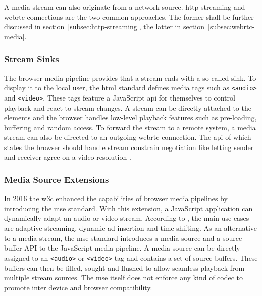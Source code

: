 A media stream can also originate from a network source. \Gls{http} streaming and \gls{webrtc} connections are the two common approaches. The former shall be further discussed in section~\ref{subsec:http-streaming}, the latter in section~\ref{subsec:webrtc-media}.

\subsubsection{Stream Sinks}

The browser media pipeline provides that a stream ends with a so called sink. To display it to the local user, the \gls{html} standard \cite[\S4.7]{html-w3c} defines media tags such as \lstinline|<audio>| and \lstinline|<video>|. These tags feature a JavaScript \gls{api} for themselves to control playback and react to stream changes. A stream can be directly attached to the elements and the browser handles low-level playback features such as pre-loading, buffering and random access. To forward the stream to a remote system, a media stream can also be directed to an outgoing \gls{webrtc} connection. The \gls{api} of which states the browser should handle stream constrain negotiation like letting sender and receiver agree on a video resolution \cite[\S5.1]{webrtc-w3c}.

\subsubsection{Media Source Extensions}

In 2016 the \gls{w3c} enhanced the capabilities of browser media pipelines by introducing the \gls{mse} standard. With this extension, a JavaScript application can dynamically adapt an audio or video stream. According to \cite{mse-google}, the main use cases are adaptive streaming, dynamic ad insertion and time shifting. As an alternative to a media stream, the \gls{mse} standard introduces a media source and a source buffer API to the JavaScript media pipeline. A media source can be directly assigned to an \lstinline|<audio>| or \lstinline|<video>| tag and contains a set of source buffers. These buffers can then be filled, sought and flushed to allow seamless playback from multiple stream sources. The \gls{mse} itself does not enforce any kind of codec to promote inter device and browser compatibility.

